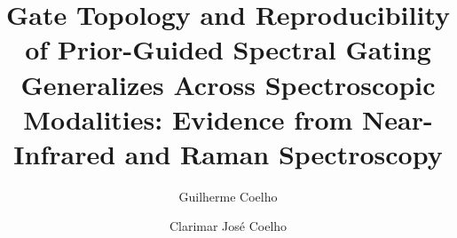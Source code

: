 \documentclass[preprint,12pt]{elsarticle}
\providecommand{\DIFaddtex}[1]{{\protect\color{blue} \sf #1}} %
\providecommand{\DIFdeltex}[1]{{\protect\color{red} \scriptsize #1}} %
\providecommand{\DIFaddbegin}{} %
\providecommand{\DIFaddend}{} %
\providecommand{\DIFdelbegin}{} %
\providecommand{\DIFdelend}{} %
\providecommand{\DIFadd}[1]{\texorpdfstring{\DIFaddtex{#1}}{#1}} %
\providecommand{\DIFdel}[1]{\texorpdfstring{\DIFdeltex{#1}}{}} %
\providecommand{\DIFscaledelfig}{0.5}
\newlength{\DIFdelgraphicswidth} %
\newlength{\DIFdelgraphicsheight} %
\providecommand{\DIFaddincludegraphics}[2][]{{\color{blue}\fbox{\DIFOincludegraphics[#1]{#2}}}} %
\providecommand{\DIFdelincludegraphics}[2][]{%
\sbox{\DIFdelgraphicsbox}{\DIFOincludegraphics[#1]{#2}}%
\settoboxwidth{\DIFdelgraphicswidth}{\DIFdelgraphicsbox} %
\settoboxtotalheight{\DIFdelgraphicsheight}{\DIFdelgraphicsbox} %
\scalebox{\DIFscaledelfig}{%
\parbox[b]{\DIFdelgraphicswidth}{\usebox{\DIFdelgraphicsbox}\\[-\baselineskip] \rule{\DIFdelgraphicswidth}{0em}}\llap{\resizebox{\DIFdelgraphicswidth}{\DIFdelgraphicsheight}{%
\setlength{\unitlength}{\DIFdelgraphicswidth}%
\begin{picture}(1,1)%
\thicklines\linethickness{2pt} %
{\color[rgb]{1,0,0}\put(0,0){\framebox(1,1){}}}%
{\color[rgb]{1,0,0}\put(0,0){\line( 1,1){1}}}%
{\color[rgb]{1,0,0}\put(0,1){\line(1,-1){1}}}%
\end{picture}%
}\hspace*{3pt}}} %
} %
\DeclareRobustCommand{\DIFaddbegin}{\DIFOaddbegin \let\includegraphics\DIFaddincludegraphics} %
\DeclareRobustCommand{\DIFaddend}{\DIFOaddend \let\includegraphics\DIFOincludegraphics} %
\DeclareRobustCommand{\DIFdelbegin}{\DIFOdelbegin \let\includegraphics\DIFdelincludegraphics} %
\DeclareRobustCommand{\DIFdelend}{\DIFOaddend \let\includegraphics\DIFOincludegraphics} %
\begin{document}
\begin{frontmatter}

\title{\DIFaddbegin \DIFadd{Gate Topology and Reproducibility of }\DIFaddend Prior-Guided Spectral Gating \DIFdelbegin \DIFdel{Generalizes }\DIFdelend Across \DIFdelbegin \DIFdel{Spectroscopic Modalities: Evidence from }\DIFdelend Near-Infrared and Raman Spectroscopy}

\author[unicamp]{Guilherme Coelho}
\author[puc]{Clarimar José Coelho}
\address[unicamp]{State University of Campinas, 
            Cidade Universitária Zeferino Vaz - Barão Geraldo, 
            Campinas,
            13083--970, 
            São Paulo,
            Brazil}
\address[puc]{Postgraduate Program in Industrial Engineering and Artificial Intelligence Pontificia Universidade Catolica de Goias, Primeira Avenida, s/n - Quadra 88 - Setor Leste Universitário, 
            Goiânia, 74605--010, Goiás, Brazil} 



\end{frontmatter}
\end{document}
